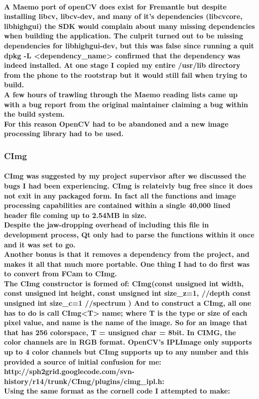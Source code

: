\documentclass[11pt]{article} %
\begin{document}
\paragraph{
A Maemo port of openCV does exist for Fremantle \cite{libcv} but despite installing libcv, libcv-dev, and many of it's dependencies (libcvcore, libhighgui) the SDK would complain about many missing dependencies when building the application. The culprit turned out to be missing dependencies for libhighgui-dev, but this was false since running a quit dpkg -L <dependency\_name> confirmed that the dependency was indeed installed. At one stage I copied my entire /usr/lib directory from the phone to the rootstrap but it would still fail when trying to build.\\
A few hours of trawling through the Maemo reading lists came up with a bug report \cite{highgui-dev} from the original maintainer claiming a bug within the build system.\\
For this reason OpenCV had to be abandoned and a new image processing library had to be used.
}
\subsubsection{CImg}
\paragraph{CImg was suggested by my project supervisor after we discussed the bugs I had been experiencing. CImg is relateivly bug free since it does not exit in any packaged form. In fact all the functions and image processing capabilities are contained within a single 40,000 lined header file coming up to 2.54MB in size. \\Despite the jaw-dropping overhead of including this file in development process, Qt only had to parse the functions within it once and it was set to go.\\
Another bonus is that it removes a dependency from the project, and makes it all that much more portable. One thing I had to do first was to convert from FCam to CImg.
\\The CImg constructor is formed of: 
CImg(const unsigned int width,
     const unsigned int height,
     const unsigned int size\_z=1, //depth
     const unsigned int size\_c=1 //spectrum
)
And to construct a CImg, all one has to do is call CImg<T> name; where T is the type or size of each pixel value, and name is the name of the image. So for an image that that has 256 colorspace, T = unsigned char = 8bit.
In CIMG, the color channels are in RGB format. OpenCV's IPLImage only supports up to 4 color channels but CImg supports up to any number and this provided a source of initial confusion for me:
http://sph2grid.googlecode.com/svn-history/r14/trunk/CImg/plugins/cimg\_ipl.h:\\
Using the same format as the cornell code I attempted to make:}

\end{document}
